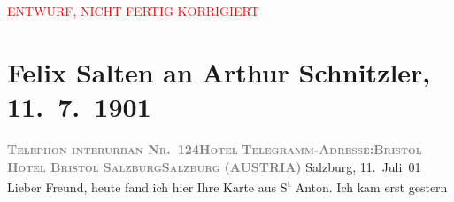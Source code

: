 
\begin{center}
            \textcolor{red}{ENTWURF, NICHT FERTIG KORRIGIERT}
                      \end{center}
            
         
         \renewcommand{\erwaehntePersonen}{Personen: Hugo Felix, Georges Fragerolle, Henri Rivière, Julius Szeps}
         \renewcommand{\erwaehnteInstitutionen}{Institutionen: Le Chat Noir, Wiener Allgemeine Zeitung}
         \renewcommand{\erwaehnteOrte}{Orte: Arlberg, Bad Ischl, Darmstadt, Hotel Bristol Salzburg, Salzburg, St. Anton am Arlberg, Wien, Zürich, Österreich}
         \renewcommand{\erwaehnteWerke}{Werke: Frau Bertha Garlan. Roman, Wiener Allgemeine Zeitung, »Lieutenant Gustl.« (Ein ehrenrätliches Urtheil.)}
               \section[Felix Salten an Arthur Schnitzler, 11. 7. 1901]{ Felix Salten an Arthur Schnitzler, 11. 7. 1901}\nopagebreak{}\rehead{ }\begin{ledgroupsized}[t]{13cm}\normalsize\beginnumbering \toendnotes[C]{\smallbreak\pagebreak[2]} 
\toendnotes[C]{\smallbreak}\pstart
           \noindent{}{\pb}\textcolor{gray}{\textbf{\textsc{Telephon interurban Nr. 124}}}\hfill \textcolor{gray}{\textbf{\textsc{Hotel}}}\pend
           \pstart
           \textcolor{gray}{\textbf{\textsc{Telegramm-Adresse:}}}\hfill \textcolor{gray}{\textbf{\textsc{Bristol}}}\pend
           \pstart
           \textcolor{gray}{\textbf{\textsc{Hotel Bristol Salzburg}}}\hfill \textcolor{gray}{\textbf{\textsc{Salzburg}}}\pend
           \pstart
           \raggedleft{}\textcolor{gray}{\textbf{(AUSTRIA)}}\pend
           \pstart
           \raggedleft{}Salzburg, 11. Juli 01\pend
           \pstart
           Lieber Freund, heute fand ich hier Ihre Karte aus S\textsuperscript{t} Anton. Ich kam erst gestern

\end{ledgroupsized}
